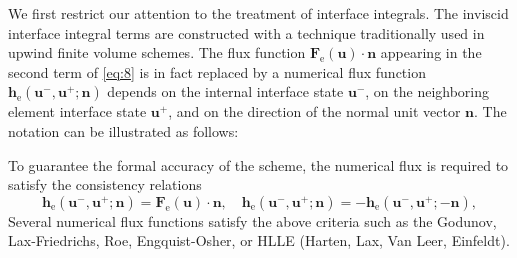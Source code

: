 \documentclass{develop-note}
\begin{document}
We first restrict our attention to the treatment of interface integrals. The inviscid interface integral terms are constructed with a technique traditionally used in upwind finite volume schemes. The flux function $\mathbf{F}_{\mathrm{e}}(\mathbf{u})\cdot\mathbf{n}$ appearing in the second term of \autoref{eq:8} is in fact replaced by a numerical flux function $\mathbf{h}_{\mathrm{e}}(\mathbf{u}^{-},\mathbf{u}^{+};\mathbf{n})$ depends on the internal interface state $\mathbf{u}^{-}$, on the neighboring element interface state $\mathbf{u}^{+}$, and on the direction of the normal unit vector $\mathbf{n}$. The notation can be illustrated as follows:
\begin{figure}[H]
  \centering
\end{figure}
To guarantee the formal accuracy of the scheme, the numerical flux is required to satisfy the consistency relations
\begin{equation}
  \label{eq:10}
  \mathbf{h}_{\mathrm{e}}(\mathbf{u}^{-},\mathbf{u}^{+};\mathbf{n})=\mathbf{F}_{\mathrm{e}}(\mathbf{u})\cdot\mathbf{n},\quad\mathbf{h}_{\mathrm{e}}(\mathbf{u}^{-},\mathbf{u}^{+};\mathbf{n})=-\mathbf{h}_{\mathrm{e}}(\mathbf{u}^{-},\mathbf{u}^{+};-\mathbf{n}),
\end{equation}
Several numerical flux functions satisfy the above criteria such as the Godunov, Lax-Friedrichs, Roe, Engquist-Osher, or HLLE (Harten, Lax, Van Leer, Einfeldt).
\end{document}
